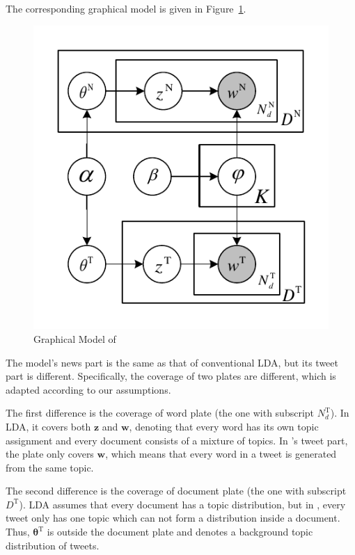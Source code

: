 The corresponding graphical model is given in Figure~\ref{fig:stlda}.

\begin{figure}[h]
\centering
\includegraphics[width=.8\linewidth]{figures/stlda_model.pdf}
\caption{Graphical Model of \stlda}\label{fig:stlda}
\end{figure}

The model's news part is the same as that of conventional LDA, but its tweet part is different.
Specifically, the coverage of two plates are different, which is adapted according to our assumptions.

The first difference is the coverage of word plate (the one with subscript $N^\mathrm{T}_d$).
In LDA, it covers both $\bm{z}$ and $\bm{w}$, denoting that every word has its own topic assignment and every document consists of a mixture of topics.
In \stlda's tweet part, the plate only covers $\bm{w}$, which means that every word in a tweet is generated from the same topic.

The second difference is the coverage of document plate (the one with subscript $D^\mathrm{T}$). LDA assumes that every document has a topic distribution, but in \stlda, every tweet only has one topic which can not form a distribution inside a document. Thus, $\bm{\theta^\mathrm{T}}$ is outside the document plate and denotes a background topic distribution of tweets.


